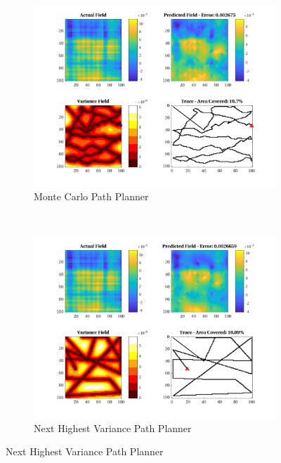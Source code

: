\begin{figure}[htb!]
    \centering
    \begin{subfigure}[t]{0.5\textwidth}
        \centering
        \includegraphics[width=\linewidth]{figures/hbresults/mc_10p_100x100_sf_100_seed_2.png}
        \captionsetup{skip=0.10\baselineskip,size=footnotesize}
        \caption{Monte Carlo Path Planner}
    \end{subfigure}%
    ~ 
    \begin{subfigure}[t]{0.5\textwidth}
        \centering
        \includegraphics[width=\linewidth]{figures/hbresults/nhv_10p_100x100_sf_100_seed_2.png}
        \captionsetup{skip=0.10\baselineskip,size=footnotesize}
        \caption{Next Highest Variance Path Planner}

\end{subfigure}
\end{figure}

